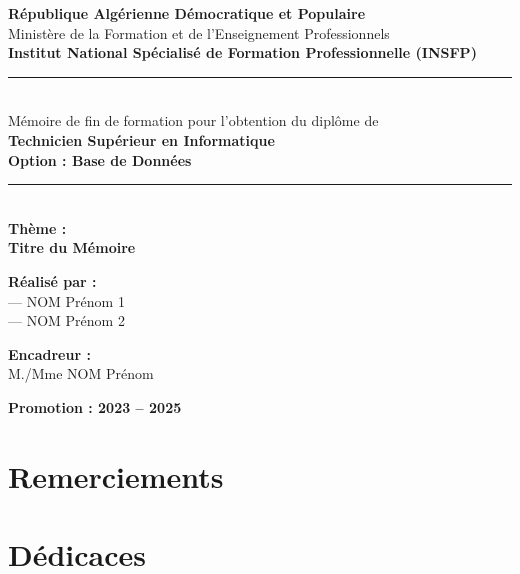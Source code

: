 \documentclass[12pt,a4paper]{report}
\begin{document}
\begin{titlepage}
\centering
\vspace*{1cm}
{\Large \textbf{République Algérienne Démocratique et Populaire}}\\[0.3cm]
{\large Ministère de la Formation et de l'Enseignement Professionnels}\\[0.5cm]
{\Large \textbf{Institut National Spécialisé de Formation Professionnelle (INSFP)}}\\[1cm]
\rule{\textwidth}{0.5pt}\\[0.5cm]
{\large Mémoire de fin de formation pour l'obtention du diplôme de}\\[0.3cm]
{\Large \textbf{Technicien Supérieur en Informatique}}\\[0.3cm]
{\large \textbf{Option : Base de Données}}\\[0.5cm]
\rule{\textwidth}{0.5pt}\\[1cm]
{\LARGE \textbf{Thème :}}\\[0.5cm]
{\Huge \textbf{Titre du Mémoire}}\\[1.5cm]

\begin{minipage}[t]{0.45\textwidth}
\textbf{Réalisé par :}\\
--- NOM Prénom 1\\
--- NOM Prénom 2
\end{minipage}
\hfill
\begin{minipage}[t]{0.45\textwidth}
\textbf{Encadreur :}\\
M./Mme NOM Prénom
\end{minipage}

\vfill
{\large \textbf{Promotion : 2023 -- 2025}}
\end{titlepage}

\chapter*{Remerciements}

\chapter*{Dédicaces}

\newpage
\tableofcontents
\newpage
\listoffigures
\end{document}
